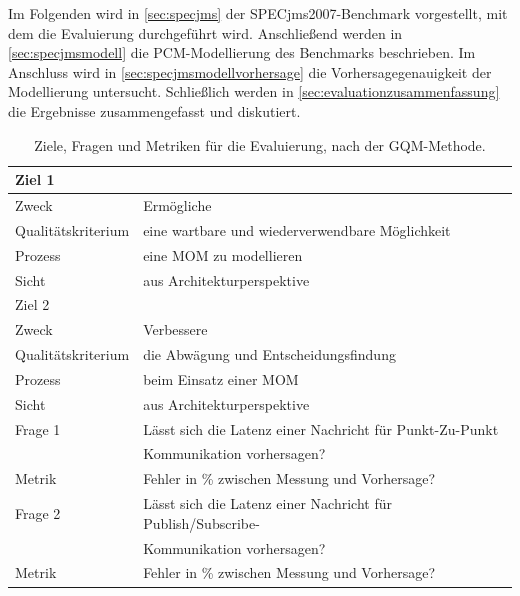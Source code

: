 Im Folgenden wird in \autoref{sec:specjms} der SPECjms2007-Benchmark vorgestellt, mit dem die Evaluierung durchgeführt wird. Anschließend werden in \autoref{sec:specjmsmodell} die PCM-Modellierung des Benchmarks beschrieben. Im Anschluss wird in \autoref{sec:specjmsmodellvorhersage} die Vorhersagegenauigkeit der Modellierung untersucht. Schließlich werden in \autoref{sec:evaluationzusammenfassung} die Ergebnisse zusammengefasst und diskutiert. 
\begin{table}
\centering
  \begin{tabular}{|l|l|}
    \hline
    \multicolumn{2}{|l|}{Ziel 1} \\
    \hline
    Zweck & Ermögliche \\
    Qualitätskriterium & eine wartbare und wiederverwendbare Möglichkeit  \\ 
    Prozess & eine MOM zu modellieren \\
    Sicht & aus Architekturperspektive \\
   
    \hline \hline
    \multicolumn{2}{|l|}{Ziel 2} \\
    \hline
    Zweck & Verbessere \\
    Qualitätskriterium & die Abwägung und Entscheidungsfindung  \\ 
    Prozess & beim Einsatz einer MOM \\
    Sicht & aus Architekturperspektive \\
    \hline \hline
    Frage 1 & Lässt sich die Latenz einer Nachricht für Punkt-Zu-Punkt \\
    & Kommunikation vorhersagen? \\
    \hline
    Metrik & Fehler in \% zwischen Messung und Vorhersage? \\
    \hline \hline
    Frage 2 & Lässt sich die Latenz einer Nachricht für Publish/Subscribe-\\
    & Kommunikation vorhersagen? \\
    \hline
    Metrik & Fehler in \% zwischen Messung und Vorhersage? \\
    \hline
  \end{tabular}
	\caption{\label{tab:gqm} Ziele, Fragen und Metriken für die Evaluierung, nach der GQM-Methode.}
\end{table}


